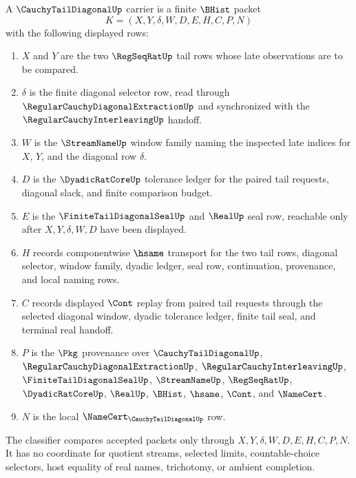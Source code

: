 \begin{definition}\label{def:cauchy-tail-diagonal-carrier}
A $\CauchyTailDiagonalUp$ carrier is a finite $\BHist$ packet
$$
K=(X,Y,\delta,W,D,E,H,C,P,N)
$$
with the following displayed rows:
\begin{enumerate}
\item $X$ and $Y$ are the two $\RegSeqRatUp$ tail rows whose late observations are to be compared.
\item $\delta$ is the finite diagonal selector row, read through $\RegularCauchyDiagonalExtractionUp$ and synchronized with the $\RegularCauchyInterleavingUp$ handoff.
\item $W$ is the $\StreamNameUp$ window family naming the inspected late indices for $X$, $Y$, and the diagonal row $\delta$.
\item $D$ is the $\DyadicRatCoreUp$ tolerance ledger for the paired tail requests, diagonal slack, and finite comparison budget.
\item $E$ is the $\FiniteTailDiagonalSealUp$ and $\RealUp$ seal row, reachable only after $X,Y,\delta,W,D$ have been displayed.
\item $H$ records componentwise $\hsame$ transport for the two tail rows, diagonal selector, window family, dyadic ledger, seal row, continuation, provenance, and local naming rows.
\item $C$ records displayed $\Cont$ replay from paired tail requests through the selected diagonal window, dyadic tolerance ledger, finite tail seal, and terminal real handoff.
\item $P$ is the $\Pkg$ provenance over $\CauchyTailDiagonalUp$, $\RegularCauchyDiagonalExtractionUp$, $\RegularCauchyInterleavingUp$, $\FiniteTailDiagonalSealUp$, $\StreamNameUp$, $\RegSeqRatUp$, $\DyadicRatCoreUp$, $\RealUp$, $\BHist$, $\hsame$, $\Cont$, and $\NameCert$.
\item $N$ is the local $\NameCert_{\CauchyTailDiagonalUp}$ row.
\end{enumerate}
The classifier compares accepted packets only through $X,Y,\delta,W,D,E,H,C,P,N$. It has no coordinate for quotient streams, selected limits, countable-choice selectors, host equality of real names, trichotomy, or ambient completion.
\end{definition}

